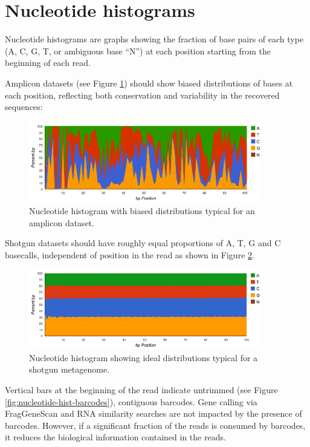 \documentclass[12pt,fullpage]{report}
\begin{document}
\section{Nucleotide histograms}

Nucleotide histograms are graphs showing the fraction of base pairs of each type (A, C, G, T, or ambiguous base ``N'') at each position starting from the beginning of each read.

Amplicon datasets (see Figure \ref{fig:nucleotide-hist-amplicon}) should show biased distributions of bases at each position, reflecting both conservation and variability in the recovered sequences:

\begin{figure}[ht]
\begin{center}
\includegraphics[width=4in]{Images/nucleotide-hist-amplicon.png}
\end{center}
\caption{
 Nucleotide histogram with biased distributions typical for an amplicon dataset.}
\label{fig:nucleotide-hist-amplicon}
\end{figure}

Shotgun datasets should have roughly equal proportions of A, T, G and C basecalls, independent of position in the read as shown in Figure \ref{fig:nucleotide-hist-ok}.

\begin{figure}[ht]
\begin{center}
\includegraphics[width=4in]{Images/nucleotide-hist-ok.png}
\end{center}
\caption{
Nucleotide histogram showing ideal distributions typical for a shotgun metagenome.
}
\label{fig:nucleotide-hist-ok}
\end{figure}

Vertical bars at the beginning of the read indicate untrimmed (see Figure \ref{fig:nucleotide-hist-barcodes}), contiguous barcodes. Gene calling via FragGeneScan \cite{FGS} and \gls{RNA} similarity searches are not impacted by the presence of barcodes. However, if a significant fraction of the reads is consumed by barcodes, it reduces the biological information contained in the reads.
\end{document}
